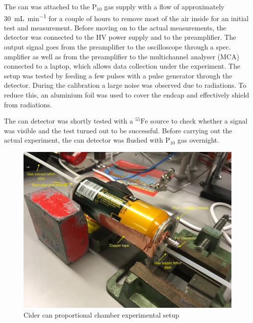 The can was attached to the $\mathrm{P}_{10}$ gas supply with a flow of
approximately \SI{30}{\milli\liter\per\minute} for a couple of hours to remove
most of the air inside for an initial test and measurement. Before moving on to
the actual measurements, the detector was connected to the HV power supply and
to the preamplifier. The output signal goes from the preamplifier to the
oscilloscope through a spec. amplifier as well as from the preamplifier to the
multichannel analyser (MCA) connected to a laptop, which allows data collection
under the experiment. The setup was tested by feeding a few pulses with a pulse
generator through the detector. During the calibration a large noise was
observed due to radiations. To reduce this, an aluminium foil was used to cover
the endcap and effectively shield from radiations.


The can detector was shortly tested with a $^{55}\mathrm{Fe}$ source to check
whether a signal was visible and the test turned out to be successful. Before
carrying out the actual experiment, the can detector was flushed with
$\mathrm{P}_{10}$ gas overnight.

\begin{figure}[h!]
	\centering
	\includegraphics[width=\textwidth]{./graphics/BeerCanSetup.JPG}
	\caption{Cider can proportional chamber experimental setup}
	\label{fig:BeerCan}
\end{figure}

